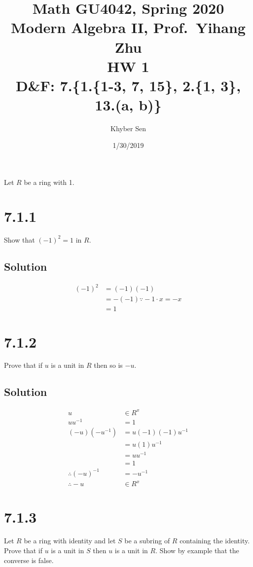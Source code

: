 \documentclass[fleqn]{article}
\title{
Math GU4042, Spring 2020 \\
Modern Algebra II, Prof.\ Yihang Zhu \\
HW 1 \\
D\&F: 7.\{1.\{1-3, 7, 15\}, 2.\{1, 3\}, 13.(a, b)\}
}
\author{Khyber Sen}
\date{1/30/2019}
\begin{document}
    
    \maketitle
    
    Let $R$ be a ring with 1.
    
    \section{7.1.1}
    Show that $(-1)^2 = 1$ in $R$.
        
        \subsection{Solution}
        \begin{align}
            (-1)^2 &= (-1)(-1) \\
                &= -(-1) \because{} -1 \cdot x = -x \\
                &= 1
        \end{align}
    
    \section{7.1.2}
    Prove that if $u$ is a unit in $R$ then so is $-u$.
        
        \subsection{Solution}
        \begin{align}
            u &\in R^x \\
            u u^{-1} &= 1 \\
            (-u)(-u^{-1}) &= u (-1)(-1) u^{-1} \\
                &= u (1) u^{-1} \\
                &= u u^{-1} \\
                &= 1 \\
            \therefore{} (-u)^{-1} &= -u^{-1} \\
            \therefore{} -u &\in R^x
        \end{align}
    
    \section{7.1.3}
    Let $R$ be a ring with identity and let $S$ be a subring of $R$ containing the identity.  Prove that if $u$ is a unit in $S$ then $u$ is a unit in $R$.  Show by example that the converse is false.
        
\end{document}
